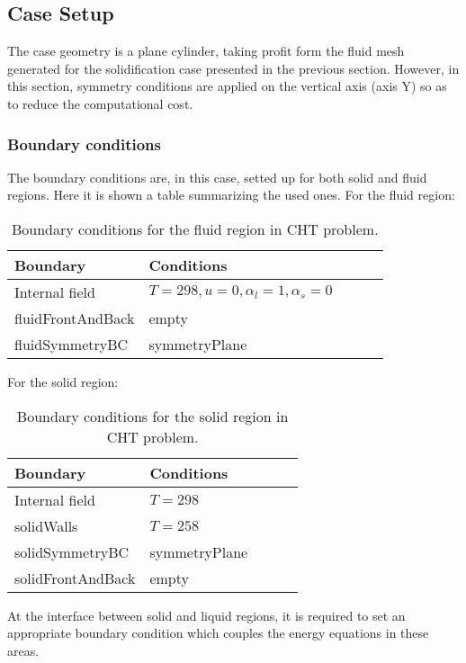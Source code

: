 \subsection{Case Setup}

\setlength{\parindent}{0.5cm} The case geometry is a plane cylinder, taking profit form the fluid mesh generated for the solidification case presented in the previous section. However, in this section, symmetry conditions are applied on the vertical axis (axis Y) so as to reduce the computational cost. 

\subsubsection{Boundary conditions}

\setlength{\parindent}{0.5cm} The boundary conditions are, in this case, setted up for both solid and fluid regions. Here it is shown a table summarizing the used ones.
\newline
For the fluid region:
\begin{table}[h!]
	\begin{tabular}{@{}lllll@{}}
		\toprule[1pt]
		\textbf{Boundary} & \textbf{Conditions}  \\ \midrule[2pt]
		Internal field & $ T = 298, u = 0, \alpha_{l} = 1, \alpha_{s} = 0    $  \\
		fluidFrontAndBack & empty \\
		fluidSymmetryBC & symmetryPlane \\ \bottomrule[1pt]		
	\end{tabular}
	\centering
	\caption{Boundary conditions for the fluid region in CHT problem.}	
	\label{4.1tab}
\end{table}
For the solid region:
\begin{table}[h!]
	\begin{tabular}{@{}lllll@{}}
		\toprule[1pt]
		\textbf{Boundary} & \textbf{Conditions}  \\ \midrule[2pt]
		Internal field & $ T = 298$\\
		solidWalls & $T = 258$ \\
		solidSymmetryBC & symmetryPlane \\
		solidFrontAndBack & empty \\ \bottomrule[1pt]		
	\end{tabular}
	\centering
	\caption{Boundary conditions for the solid region in CHT problem.}	
	\label{4.2tab}
\end{table}

\noindent At the interface between solid and liquid regions, it is required to set an appropriate boundary condition which couples the energy equations in these areas.

